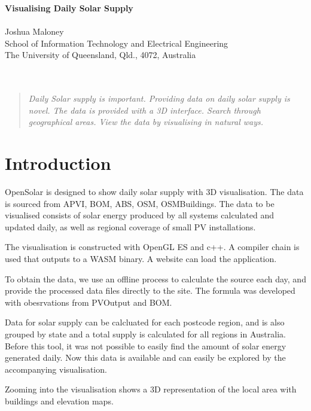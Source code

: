 \documentclass[10pt, a4paper]{article}
\begin{document}
\begin{center}
\Large
\textbf{Visualising Daily Solar Supply } \\ 
\hfill\\
\large
Joshua Maloney \\
School of Information Technology and Electrical Engineering \\
The University of Queensland, Qld., 4072, Australia \\
\hfill\\
\hfill\\
\end{center}


\begin{multicols}{2}

\begin{abstract}
\textit{
   Daily Solar supply is important.
   Providing data on daily solar supply is novel.
   The data is provided with a 3D interface.
   Search through geographical areas.
   View the data by visualising in natural ways.
  }
\end{abstract}

\section{Introduction}

OpenSolar is designed to show daily solar supply with 3D visualisation. The data is sourced from APVI, BOM, ABS, OSM, OSMBuildings. The data to be visualised consists of solar energy produced by all systems calculated and updated daily, as well as regional coverage of small PV installations.

The visualisation is constructed with OpenGL ES and c++. A compiler chain is used that outputs to a WASM binary. A website can load the application.

To obtain the data, we use an offline process to calculate the source each day, and provide the processed data files directly to the site.
The formula was developed with obesrvations from PVOutput and BOM.

Data for solar supply can be calcluated for each postcode region, and is also grouped by state and a total supply is calculated for all regions in Australia. Before this tool, it was not possible to easily find the amount of solar energy generated daily. Now this data is available and can easily be explored by the accompanying visualisation.

Zooming into the visualisation shows a 3D representation of the local area with buildings and elevation maps. 


\end{multicols}
\end{document}

